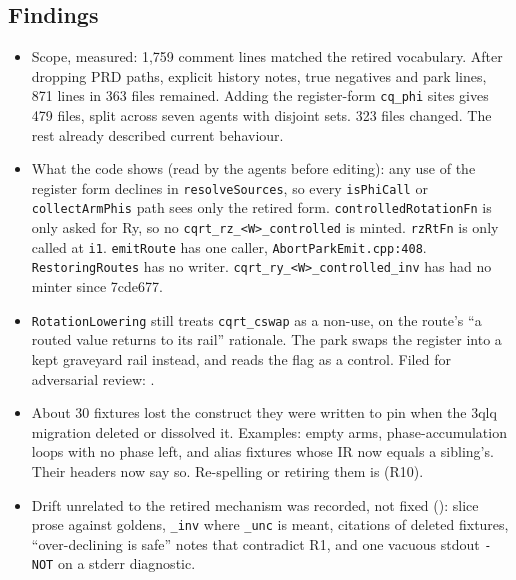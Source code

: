 \subsection*{Findings}
\begin{itemize}
  \item Scope, measured: 1,759 comment lines matched the retired vocabulary. After
  dropping PRD paths, explicit history notes, true negatives and park lines, 871 lines in
  363 files remained. Adding the register-form \texttt{cq\_phi} sites gives 479 files,
  split across seven agents with disjoint sets. 323 files changed. The rest already
  described current behaviour.
  \item What the code shows (read by the agents before editing): any use of the register
  form declines in \texttt{resolveSources}, so every \texttt{isPhiCall} or
  \texttt{collectArmPhis} path sees only the retired form. \texttt{controlledRotationFn}
  is only asked for Ry, so no \texttt{cqrt\_rz\_<W>\_controlled} is minted.
  \texttt{rzRtFn} is only called at \texttt{i1}. \texttt{emitRoute} has one caller,
  \texttt{AbortParkEmit.cpp:408}. \texttt{RestoringRoutes} has no writer.
  \texttt{cqrt\_ry\_<W>\_controlled\_inv} has had no minter since 7cde677.
  \item {} \texttt{RotationLowering} still treats \texttt{cqrt\_cswap} as a
  non-use, on the route's ``a routed value returns to its rail'' rationale. The park swaps
  the register into a kept graveyard rail instead, and reads the flag as a control. Filed
  for adversarial review: .
  \item About 30 fixtures lost the construct they were written to pin when the 3qlq
  migration deleted or dissolved it. Examples: empty arms, phase-accumulation loops with
  no phase left, and alias fixtures whose IR now equals a sibling's. Their headers now say
  so. Re-spelling or retiring them is  (R10).
  \item Drift unrelated to the retired mechanism was recorded, not fixed
  (): slice prose against goldens, \texttt{\_inv} where
  \texttt{\_unc} is meant, citations of deleted fixtures, ``over-declining is safe'' notes
  that contradict R1, and one vacuous stdout \texttt{-NOT} on a stderr diagnostic.
\end{itemize}

